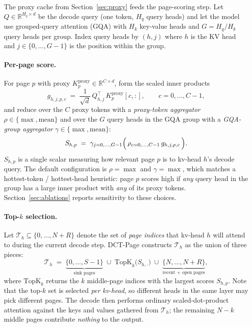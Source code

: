 The proxy cache from Section~\ref{sec:proxy} feeds the page-scoring
step.  Let
$Q \in \mathbb{R}^{H_q \times d}$ be the decode query (one token,
$H_q$ query heads) and let the model use grouped-query attention
(GQA) with $H_k$ key-value heads and $G = H_q / H_k$ query heads per
group.  Index query heads by $(h, j)$ where $h$ is the KV head and
$j \in \{0, \dots, G{-}1\}$ is the position within the group.

\paragraph{Per-page score.}
For page $p$ with proxy
$K_p^{\text{proxy}} \in \mathbb{R}^{C \times d}$,
form the scaled inner products
\begin{equation}\label{eq:innerprod}
  g_{h,j,p,c} \;=\;
  \frac{1}{\sqrt{d}}\,
  Q_{h,j}^{\top}\,K_p^{\text{proxy}}[c, :],
  \qquad c = 0, \dots, C{-}1,
\end{equation}
and reduce over the $C$ proxy tokens with a
\emph{proxy-token aggregator} $\rho \in \{\max, \mathrm{mean}\}$ and
over the $G$ query heads in the GQA group with a
\emph{GQA-group aggregator} $\gamma \in \{\max, \mathrm{mean}\}$:
\begin{equation}\label{eq:score}
  S_{h,p}
  \;=\;
  \gamma_{j=0,\dots,G-1}
  \Bigl(\,
    \rho_{c=0,\dots,C-1}\, g_{h,j,p,c}
  \,\Bigr).
\end{equation}
$S_{h,p}$ is a single scalar measuring how relevant page $p$ is to
kv-head $h$'s decode query.  The default configuration is
$\rho = \max$ and $\gamma = \max$, which matches a hottest-token /
hottest-head heuristic: page $p$ scores high if \emph{any} query head
in the group has a large inner product with \emph{any} of its proxy
tokens.  Section~\ref{sec:ablations} reports sensitivity to these
choices.

\paragraph{Top-$k$ selection.}
Let $\mathcal{T}_h \subseteq \{0, \dots, N{+}R\}$ denote the set of
\emph{page indices} that kv-head $h$ will attend to during the current
decode step.  DCT-Page constructs $\mathcal{T}_h$ as the union of
three pieces:
\begin{equation}\label{eq:select}
  \mathcal{T}_h
  \;=\;
  \underbrace{\{0, \dots, S{-}1\}}_{\text{sink pages}}
  \;\cup\;
  \mathrm{TopK}_{k}\!\bigl(S_{h,\cdot}\bigr)
  \;\cup\;
  \underbrace{\{N, \dots, N{+}R\}}_{\text{recent + open pages}},
\end{equation}
where $\mathrm{TopK}_k$ returns the $k$ middle-page indices with the
largest scores $S_{h,p}$.  Note that the top-$k$ set is selected
\emph{per kv-head}, so different heads in the same layer may pick
different pages.  The decode then performs ordinary
scaled-dot-product attention against the keys and values gathered from
$\mathcal{T}_h$; the remaining $N - k$ middle pages contribute
\emph{nothing} to the output.

